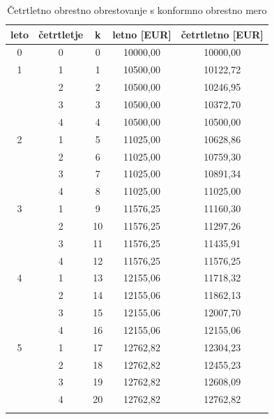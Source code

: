 \documentclass[12pt]{article}
\begin{document}
        \begin{longtable}{|c|c|c|c|c|}
            \hline
            \textbf{leto} & \textbf{četrtletje} & \textbf{k} & \textbf{letno [EUR]} & \textbf{četrtletno [EUR]} \\ \hline
            \endfirsthead
            \endhead
            0 & 0 & 0  & 10000,00  & 10000,00  \\ \hline \hline
            1 & 1 & 1  & 10500,00  & 10122,72  \\ \hline
              & 2 & 2  & 10500,00  & 10246,95  \\ \hline
              & 3 & 3  & 10500,00  & 10372,70  \\ \hline
              & 4 & 4  & 10500,00  & 10500,00  \\ \hline \hline
            2 & 1 & 5  & 11025,00  & 10628,86  \\ \hline
              & 2 & 6  & 11025,00  & 10759,30  \\ \hline
              & 3 & 7  & 11025,00  & 10891,34  \\ \hline
              & 4 & 8  & 11025,00  & 11025,00  \\ \hline \hline
            3 & 1 & 9  & 11576,25  & 11160,30  \\ \hline
              & 2 & 10 & 11576,25  & 11297,26  \\ \hline
              & 3 & 11 & 11576,25  & 11435,91  \\ \hline
              & 4 & 12 & 11576,25  & 11576,25  \\ \hline \hline
            4 & 1 & 13 & 12155,06  & 11718,32  \\ \hline
              & 2 & 14 & 12155,06  & 11862,13  \\ \hline
              & 3 & 15 & 12155,06  & 12007,70  \\ \hline
              & 4 & 16 & 12155,06  & 12155,06  \\ \hline \hline
            5 & 1 & 17 & 12762,82  & 12304,23  \\ \hline
              & 2 & 18 & 12762,82  & 12455,23  \\ \hline
              & 3 & 19 & 12762,82  & 12608,09  \\ \hline
              & 4 & 20 & 12762,82  & 12762,82  \\ \hline
              \caption{Četrtletno obrestno obrestovanje s konformno obrestno mero}
        \end{longtable}
\end{document}
